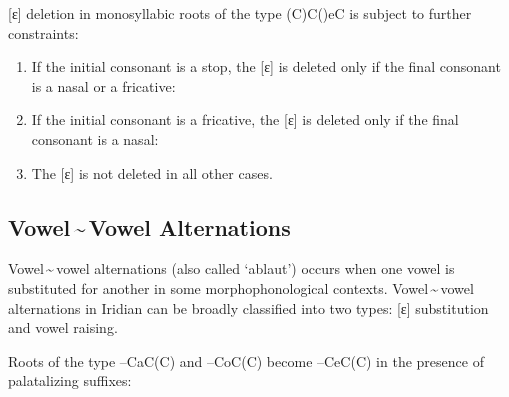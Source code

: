 \ex
{}
\xe

[ɛ] deletion in monosyllabic roots of the type (C)C()eC is subject to
further constraints:

\begin{enumerate}
	\item If the initial consonant is a stop, the [ɛ] is deleted only if the final consonant is a nasal or a fricative:\\

	\item If the initial consonant is a fricative, the [ɛ] is deleted only if the final consonant is a nasal:\\

	\item The [ɛ] is not deleted in all other cases.
\end{enumerate}

\subsection{Vowel\,\sim\,Vowel Alternations}
Vowel\,\sim\,vowel alternations (also called `ablaut') occurs when one vowel is
substituted for another in some morphophonological contexts. Vowel\,\sim\,vowel
alternations in Iridian can be broadly classified into two types: [ɛ]
substitution and vowel raising.

Roots of the type --CaC(C) and --CoC(C) become --CeC(C) in the
presence of palatalizing suffixes:

\ex
{}
\xe

